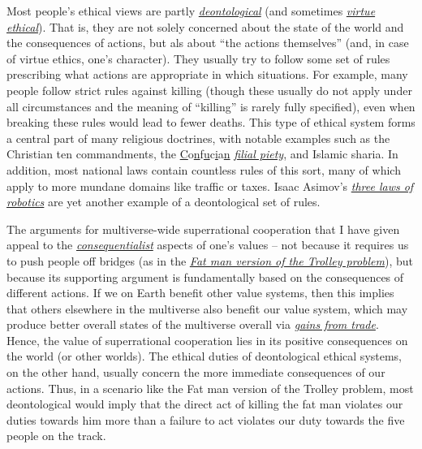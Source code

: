 Most people's ethical views are partly
\href{https://en.wikipedia.org/wiki/Deontological_ethics}{\emph{\emph{deontological}}}
(and sometimes
\href{https://en.wikipedia.org/wiki/Virtue_ethics}{\emph{\emph{virtue
ethical}}}). That is, they are not solely concerned about the state of
the world and the consequences of actions, but als about ``the actions
themselves'' (and, in case of virtue ethics, one's character). They
usually try to follow some set of rules prescribing what actions are
appropriate in which situations. For example, many people follow strict
rules against killing (though these usually do not apply under all
circumstances and the meaning of ``killing'' is rarely fully specified),
even when breaking these rules would lead to fewer deaths. This type of
ethical system forms a central part of many religious doctrines, with
notable examples such as the Christian ten commandments, the
\href{https://en.wikipedia.org/wiki/Ten_Commandments}{C}o\href{https://en.wikipedia.org/wiki/Ten_Commandments}{n}f\href{https://en.wikipedia.org/wiki/Ten_Commandments}{u}c\href{https://en.wikipedia.org/wiki/Ten_Commandments}{i}a\href{https://en.wikipedia.org/wiki/Ten_Commandments}{n}
\href{https://en.wikipedia.org/wiki/Filial_piety}{\emph{filial
piety}}\href{https://en.wikipedia.org/wiki/Ten_Commandments}{,} and
Islamic sharia. In addition, most national laws contain countless rules
of this sort, many of which apply to more mundane domains like traffic
or taxes. Isaac Asimov's
\href{https://en.wikipedia.org/wiki/Three_Laws_of_Robotics}{\emph{three
laws of robotics}} are yet another example of a deontological set of
rules.

The arguments for multiverse-wide superrational cooperation that I have
given appeal to the
\href{https://en.wikipedia.org/wiki/Consequentialism}{\emph{\emph{consequentialist}}}
aspects of one's values -- not because it requires us to push people off
bridges (as in the
\href{https://en.wikipedia.org/wiki/Trolley_problem\#The_fat_man}{\emph{Fat
man version of the Trolley problem}}), but because its supporting
argument is fundamentally based on the consequences of different
actions. If we on Earth benefit other value systems, then this implies
that others elsewhere in the multiverse also benefit our value system,
which may produce better overall states of the multiverse overall via
\href{https://foundational-research.org/gains-from-trade-through-compromise/}{\emph{gains
from trade}}. Hence, the value of superrational cooperation lies in its
positive consequences on the world (or other worlds). The ethical duties
of deontological ethical systems, on the other hand, usually concern the
more immediate consequences of our actions. Thus, in a scenario like the
Fat man version of the Trolley problem, most deontological would imply
that the direct act of killing the fat man violates our duties towards
him more than a failure to act violates our duty towards the five people
on the track.

